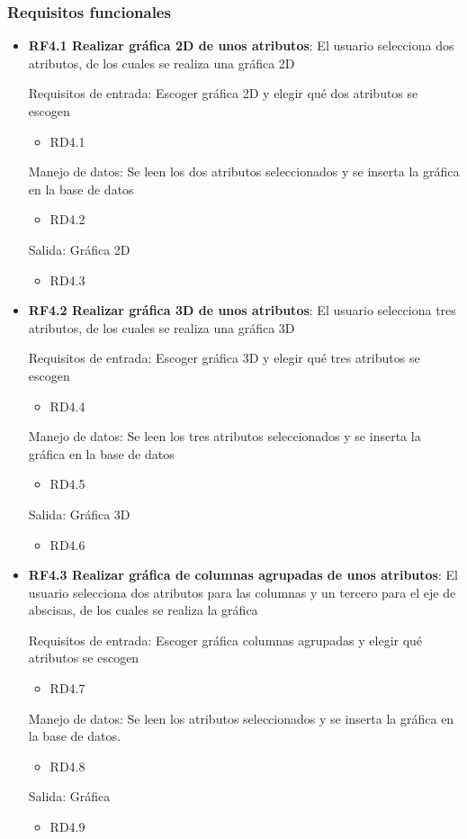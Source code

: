 \subsubsection{Requisitos funcionales}
\begin{itemize}
	\item \textbf{RF4.1 Realizar gráfica 2D de unos atributos}: El usuario selecciona dos atributos, de los cuales se realiza una gráfica 2D
	
	Requisitos de entrada: Escoger gráfica 2D y elegir qué dos atributos se escogen
	\begin{itemize}
		\item RD4.1
	\end{itemize}
	Manejo de datos: Se leen los dos atributos seleccionados  y se inserta la gráfica en la base de datos
	\begin{itemize}
		\item RD4.2
	\end{itemize}
	Salida: Gráfica 2D
	\begin{itemize}
		\item RD4.3
	\end{itemize}
	
	\item \textbf{RF4.2 Realizar gráfica 3D de unos atributos}: El usuario selecciona tres atributos, de los cuales se realiza una gráfica 3D
	
	Requisitos de entrada: Escoger gráfica 3D y elegir qué tres atributos se escogen
	\begin{itemize}
		\item RD4.4
	\end{itemize}
	Manejo de datos: Se leen los tres atributos seleccionados  y se inserta la gráfica en la base de datos
	\begin{itemize}
		\item RD4.5
	\end{itemize}
	Salida: Gráfica 3D
	\begin{itemize}
		\item RD4.6
	\end{itemize}
	
	\item \textbf{RF4.3 Realizar gráfica de columnas agrupadas de unos atributos}: El usuario selecciona dos atributos para las columnas y un tercero para el eje de abscisas, de los cuales se realiza la gráfica
	
	Requisitos de entrada: Escoger gráfica columnas agrupadas y elegir qué atributos se escogen
	\begin{itemize}
		\item RD4.7
	\end{itemize}
	Manejo de datos: Se leen los atributos seleccionados y se inserta la gráfica en la base de datos.
	\begin{itemize}
		\item RD4.8
	\end{itemize}
	Salida: Gráfica
	\begin{itemize}
		\item RD4.9
	\end{itemize}
	

\end{itemize}

